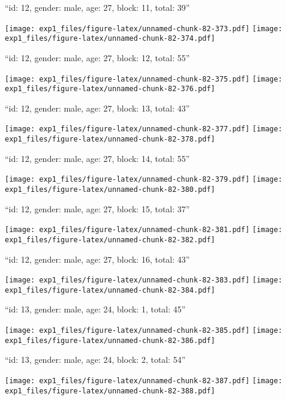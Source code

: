 \documentclass[11pt,,]{article}
\begin{document}
\newpage
[1] 

``id: 12, gender: male, age: 27, block: 11, total: 39''

\texttt{[image: exp1\_files/figure-latex/unnamed-chunk-82-373.pdf]}
\texttt{[image: exp1\_files/figure-latex/unnamed-chunk-82-374.pdf]}

\newpage
[1] 

``id: 12, gender: male, age: 27, block: 12, total: 55''

\texttt{[image: exp1\_files/figure-latex/unnamed-chunk-82-375.pdf]}
\texttt{[image: exp1\_files/figure-latex/unnamed-chunk-82-376.pdf]}

\newpage
[1] 

``id: 12, gender: male, age: 27, block: 13, total: 43''

\texttt{[image: exp1\_files/figure-latex/unnamed-chunk-82-377.pdf]}
\texttt{[image: exp1\_files/figure-latex/unnamed-chunk-82-378.pdf]}

\newpage
[1] 

``id: 12, gender: male, age: 27, block: 14, total: 55''

\texttt{[image: exp1\_files/figure-latex/unnamed-chunk-82-379.pdf]}
\texttt{[image: exp1\_files/figure-latex/unnamed-chunk-82-380.pdf]}

\newpage
[1] 

``id: 12, gender: male, age: 27, block: 15, total: 37''

\texttt{[image: exp1\_files/figure-latex/unnamed-chunk-82-381.pdf]}
\texttt{[image: exp1\_files/figure-latex/unnamed-chunk-82-382.pdf]}

\newpage
[1] 

``id: 12, gender: male, age: 27, block: 16, total: 43''

\texttt{[image: exp1\_files/figure-latex/unnamed-chunk-82-383.pdf]}
\texttt{[image: exp1\_files/figure-latex/unnamed-chunk-82-384.pdf]}

\newpage
[1] 

``id: 13, gender: male, age: 24, block: 1, total: 45''

\texttt{[image: exp1\_files/figure-latex/unnamed-chunk-82-385.pdf]}
\texttt{[image: exp1\_files/figure-latex/unnamed-chunk-82-386.pdf]}

\newpage
[1] 

``id: 13, gender: male, age: 24, block: 2, total: 54''

\texttt{[image: exp1\_files/figure-latex/unnamed-chunk-82-387.pdf]}
\texttt{[image: exp1\_files/figure-latex/unnamed-chunk-82-388.pdf]}
\end{document}

